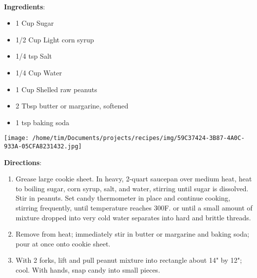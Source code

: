 \documentclass[11pt, twoside, openany]{book}
\begin{document}
 \label{peanut-brittle}\hfill\textit{}\\
\begin{minipage}[t]{0.8\linewidth}
\textbf{Ingredients}:\vspace{-3mm}
\begin{multicols}{2}
\begin{itemize}\setlength\itemsep{-1mm}
\item 1 Cup Sugar
\item 1/2 Cup Light corn syrup
\item 1/4 tsp Salt
\item 1/4 Cup Water
\item 1 Cup Shelled raw peanuts
\item 2 Tbsp butter or margarine, softened
\item 1 tsp baking soda
\end{itemize}
\end{multicols}
\end{minipage}
\begin{minipage}[t]{0.2\linewidth}
\centering \strut\vspace*{-\baselineskip}\newline
\texttt{[image: /home/tim/Documents/projects/recipes/img/59C37424-3B87-4A0C-933A-05CFA8231432.jpg]}\\
\end{minipage}\vspace{3mm}
\textbf{Directions}:
\vspace{-3mm}\begin{enumerate}\setlength\itemsep{-1mm}
\item Grease large cookie sheet. In heavy, 2-quart saucepan over medium heat, heat to boiling sugar, corn syrup, salt, and water, stirring until sugar is dissolved. Stir in peanuts. Set candy thermometer in place and continue cooking, stirring frequently, until temperature reaches 300F. or until a small amount of mixture dropped into very cold water separates into hard and brittle threads.
\item Remove from heat; immediately stir in butter or margarine and baking soda; pour at once onto cookie sheet. 
\item With 2 forks, lift and pull peanut mixture into rectangle about 14" by 12"; cool. With hands, snap candy into small pieces.
\end{enumerate}
 \label{chili-(vegetarian)}\hfill\textit{}\\
\end{document}
